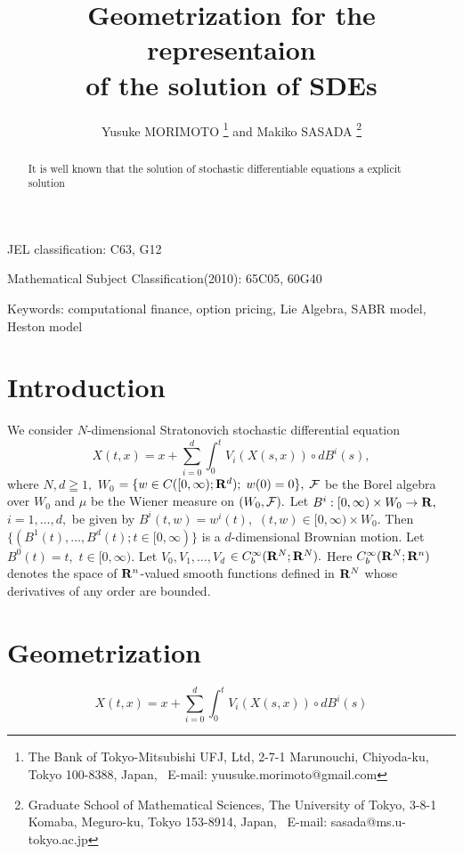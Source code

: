\documentclass[12pt]{article}
\begin{document}
\title{Geometrization for the representaion \\ of the solution of SDEs}
\author{
Yusuke MORIMOTO 
\thanks{
 The Bank of Tokyo-Mitsubishi UFJ, Ltd,
2-7-1 Marunouchi, Chiyoda-ku, Tokyo 100-8388, Japan, \
E-mail: yuusuke.morimoto@gmail.com} 
and Makiko SASADA
\thanks{
Graduate School of Mathematical Sciences, 
The University of Tokyo, 
3-8-1 Komaba, Meguro-ku, Tokyo 153-8914, Japan, \
E-mail: sasada@ms.u-tokyo.ac.jp}
}
\date{}

\maketitle

\begin{abstract}
It is well known that the solution of stochastic differentiable equations a explicit solution

\end{abstract}

JEL classification: C63, G12

Mathematical Subject Classification(2010): 65C05, 60G40

Keywords: computational finance, option pricing, Lie Algebra, SABR model, Heston model



\section{Introduction}
We consider $N$-dimensional Stratonovich stochastic differential equation 
\begin{equation}\label{sde}
X(t,x) = x + \sum_{i=0}^{d} \int_{0}^{t} V_{i}(X(s,x))\circ dB^i(s),
\end{equation}
where $N, d \geqq 1,$
$W_0$ $ = \{ w\in C([0,\infty );{\bf R}^d); \; w(0) = 0 \} ,$
${\cal F}$ be the Borel algebra over $W_0$ 
and $\mu$ be the Wiener measure on $(W_0,{\cal F}).$
Let $B^i:[0,\infty )\times W_0 \to {\bf R},$ $i=1,\ldots ,d,$ be given 
by $B^i(t,w) =w^i(t),$ $(t,w)\in [0,\infty )\times W_0.$
Then $ \{ (B^1(t), \ldots ,B^d(t) ; t \in [0,\infty ) \}$ 
is a $d$-dimensional Brownian motion.
Let $B^0(t) = t,$ $t \in [0,\infty ).$
Let $V_0,V_1,\ldots ,V_d$ 
$ \in C^{\infty}_b({\bf R}^N;{\bf R}^N).$
Here $C^{\infty}_b({\bf R}^N;{\bf R}^n)$ denotes 
the space of ${\bf R}^n$-valued smooth functions defined 
in ${\bf R}^N$ whose derivatives of any order are bounded.

\section{Geometrization}
\begin{equation*}
X(t,x) = x + \sum_{i=0}^{d} \int_{0}^{t} V_{i}(X(s,x))\circ dB^i(s)
\end{equation*}
\end{document}
